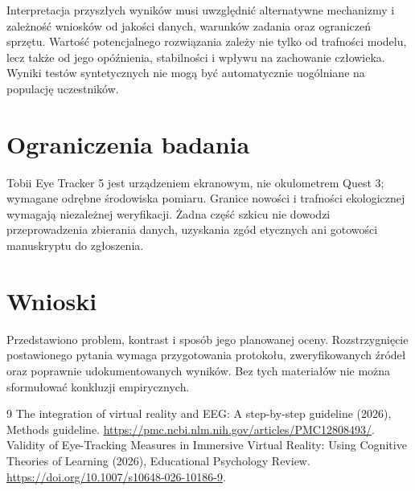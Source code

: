 \documentclass[11pt,a4paper]{article}
\begin{document}
Interpretacja przyszłych wyników musi uwzględnić alternatywne mechanizmy i zależność wniosków od jakości danych, warunków zadania oraz ograniczeń sprzętu. Wartość potencjalnego rozwiązania zależy nie tylko od trafności modelu, lecz także od jego opóźnienia, stabilności i wpływu na zachowanie człowieka. Wyniki testów syntetycznych nie mogą być automatycznie uogólniane na populację uczestników.

\section{Ograniczenia badania}

Tobii Eye Tracker 5 jest urządzeniem ekranowym, nie okulometrem Quest 3; wymagane odrębne środowiska pomiaru. Granice nowości i trafności ekologicznej wymagają niezależnej weryfikacji. Żadna część szkicu nie dowodzi przeprowadzenia zbierania danych, uzyskania zgód etycznych ani gotowości manuskryptu do zgłoszenia.

\section{Wnioski}

Przedstawiono problem, kontrast i sposób jego planowanej oceny. Rozstrzygnięcie postawionego pytania wymaga przygotowania protokołu, zweryfikowanych źródeł oraz poprawnie udokumentowanych wyników. Bez tych materiałów nie można sformułować konkluzji empirycznych.

\begin{thebibliography}{9}
 The integration of virtual reality and EEG: A step-by-step guideline (2026), Methods guideline. \url{https://pmc.ncbi.nlm.nih.gov/articles/PMC12808493/}.
 Validity of Eye-Tracking Measures in Immersive Virtual Reality: Using Cognitive Theories of Learning (2026), Educational Psychology Review. \url{https://doi.org/10.1007/s10648-026-10186-9}.
\end{thebibliography}
\end{document}

